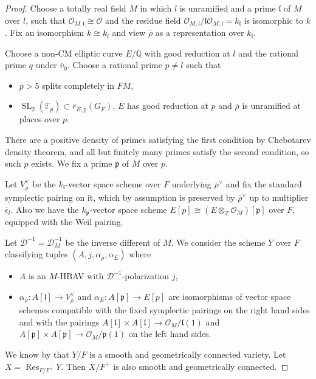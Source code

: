 \documentclass[10pt]{article}
\theoremstyle{definition}
\numberwithin{equation}{theorem}
\newcommand{\FF}{\mathbb{F}}
\newcommand{\QQ}{\mathbb{Q}}
\newcommand{\ZZ}{\mathbb{Z}}
\newcommand{\calD}{\mathcal{D}}
\newcommand{\calO}{\mathcal{O}}
\newcommand{\gothl}{\mathfrak{l}}
\newcommand{\gothp}{\mathfrak{p}}
\DeclareMathOperator{\Res}{Res}
\DeclareMathOperator{\SL}{SL}
\begin{document}
\begin{proof}
Choose a totally real field $M$ in which $l$ is unramified and a prime $\gothl$ of $M$ over $l$, such that $\calO_{M,\gothl}\cong\calO$ and the residue field $\calO_{M,\gothl}/\gothl\calO_{M,\gothl}=k_\gothl$ is isomorphic to $k$. Fix an isomorphism $k\cong k_\gothl$ and view $\overline{\rho}$ as a representation over $k_\gothl$.

Choose a non-CM elliptic curve $E/\QQ$ with good reduction at $l$ and the rational prime $q$ under $\overline{v}_0$. Choose a rational prime $p\ne l$ such that
\begin{itemize}
    \item $p>5$ splits completely in $FM$,
    \item $\SL_2(\FF_p)\subset\overline{r}_{E,p}(G_F)$, $E$ has good reduction at $p$ and $\overline{\rho}$ is unramified at places over $p$.
\end{itemize}
There are a positive density of primes satisfying the first condition by Chebotarev density theorem, and all but finitely many primes satisfy the second condition, so such $p$ exists. We fix a prime $\gothp$ of $M$ over $p$.

Let $V_{\overline{\rho}}^\vee$ be the $k_\gothl$-vector space scheme over $F$ underlying $\overline{\rho}^\vee$ and fix the standard symplectic pairing on it, which by assumption is preserved by $\overline{\rho}^\vee$ up to multiplier $\overline{\epsilon}_l$. Also we have the $k_\gothp$-vector space scheme $E[p]\cong(E\otimes_\ZZ\calO_M)[\gothp]$ over $F$, equipped with the Weil pairing.

Let $\calD^{-1}=\calD^{-1}_M$ be the inverse different of $M$. We consider the scheme $Y$ over $F$ classifying tuples $(A,j,\alpha_{\overline{\rho}},\alpha_E)$ where
\begin{itemize}
    \item $A$ is an $M$-HBAV with $\calD^{-1}$-polarization $j$,
    \item $\alpha_{\overline{\rho}}:A[\gothl]\to V_{\overline{\rho}}^\vee$ and $\alpha_E:A[\gothp]\to E[p]$ are isomorphisms of vector space schemes compatible with the fixed symplectic pairings on the right hand sides and with the pairings $A[\gothl]\times A[\gothl]\to\calO_M/\gothl(1)$ and $A[\gothp]\times A[\gothp]\to\calO_M/\gothp(1)$ on the left hand sides.
\end{itemize}
We know by \cite{Tay06} that $Y/F$ is a smooth and geometrically connected variety. Let $X=\Res_{F/F^+}Y$. Then $X/F^+$ is also smooth and geometrically connected.


\end{proof}
\end{document}
